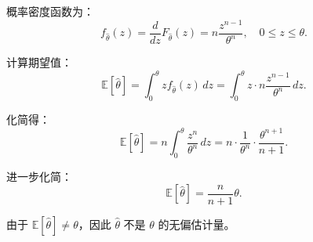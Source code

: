 \documentclass[twoside]{article}
\begin{document}
\begin{ans}{13}{13}
概率密度函数为：
\[
f_{\hat{\theta}}(z) = \frac{d}{dz} F_{\hat{\theta}}(z) = n \frac{z^{n-1}}{\theta^n}, \quad 0 \leq z \leq \theta.
\]

计算期望值：
\[
\mathbb{E}[\hat{\theta}] = \int_0^\theta z f_{\hat{\theta}}(z) \, dz = \int_0^\theta z \cdot n \frac{z^{n-1}}{\theta^n} \, dz.
\]

化简得：
\[
\mathbb{E}[\hat{\theta}] = n \int_0^\theta \frac{z^n}{\theta^n} \, dz = n \cdot \frac{1}{\theta^n} \cdot \frac{\theta^{n+1}}{n+1}.
\]

进一步化简：
\[
\mathbb{E}[\hat{\theta}] = \frac{n}{n+1} \theta.
\]

由于 \(\mathbb{E}[\hat{\theta}] \neq \theta\)，因此 \(\hat{\theta}\) 不是 \(\theta\) 的无偏估计量。

\end{ans}
\end{document}
